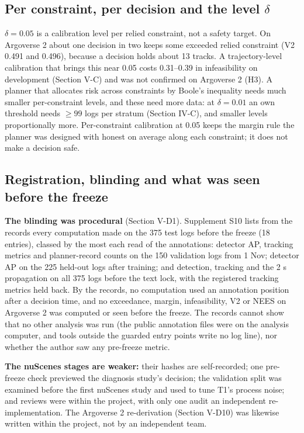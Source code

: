 \documentclass{ieeeaccess}
\begin{document}
\subsection{Per constraint, per decision and the level $\delta$}
$\delta = 0.05$ is a calibration level per relied constraint, not a safety target. On Argoverse 2 about one decision in two keeps some exceeded relied constraint (V2 0.491 and 0.496), because a decision holds about 13 tracks. A trajectory-level calibration that brings this near 0.05 costs 0.31--0.39 in infeasibility on development (Section V-C) and was not confirmed on Argoverse 2 (H3). A planner that allocates risk across constraints by Boole's inequality needs much smaller per-constraint levels, and these need more data: at $\delta = 0.01$ an own threshold needs $\geq 99$ logs per stratum (Section IV-C), and smaller levels proportionally more. Per-constraint calibration at 0.05 keeps the margin rule the planner was designed with honest on average along each constraint; it does not make a decision safe.

\subsection{Registration, blinding and what was seen before the freeze}
\textbf{The blinding was procedural} (Section V-D1). Supplement S10 lists from the records every computation made on the 375 test logs before the freeze (18 entries), classed by the most each read of the annotations: detector AP, tracking metrics and planner-record counts on the 150 validation logs from 1 Nov; detector AP on the 225 held-out logs after training; and detection, tracking and the 2 s propagation on all 375 logs before the text lock, with the registered tracking metrics held back. By the records, no computation used an annotation position after a decision time, and no exceedance, margin, infeasibility, V2 or NEES on Argoverse 2 was computed or seen before the freeze. The records cannot show that no other analysis was run (the public annotation files were on the analysis computer, and tools outside the guarded entry points write no log line), nor whether the author saw any pre-freeze metric.

\textbf{The nuScenes stages are weaker:} their hashes are self-recorded; one pre-freeze check previewed the diagnosis study's decision; the validation split was examined before the first nuScenes study and used to tune T1's process noise; and reviews were within the project, with only one audit an independent re-implementation. The Argoverse 2 re-derivation (Section V-D10) was likewise written within the project, not by an independent team.
\end{document}
